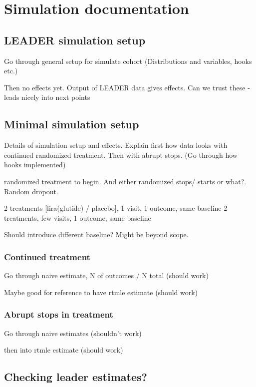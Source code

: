 \documentclass[11pt]{article}
\date{\today}
\title{}
\begin{document}
\tableofcontents

\section{Simulation documentation}
\label{sec:org4b5e02e}

\subsection{LEADER simulation setup}
\label{sec:org85cbb83}

Go through general setup for simulate cohort (Distributions
and variables, hooks etc.)

Then no effects yet. Output of LEADER data gives effects.
Can we trust these - leads nicely into next points
\subsection{Minimal simulation setup}
\label{sec:orgc5f26a2}

Details of simulation setup and effects. Explain first how
data looks with continued randomized treatment. Then with
abrupt stops. (Go through how hooks implemented)

randomized treatment to begin. And either randomized stops/
starts or what?. Random dropout.

2 treatments [lira(glutide) / placebo], 1 visit, 1 outcome, same baseline
2 treatments, few visits, 1 outcome, same baseline

Should introduce different baseline? Might be beyond scope.
\subsubsection{Continued treatment}
\label{sec:org838aba7}

Go through naive estimate, N of outcomes / N total (should work)

Maybe good for reference to have rtmle estimate (should work)
\subsubsection{Abrupt stops in treatment}
\label{sec:orgba15482}

Go through naive estimates (shouldn't work)

then into rtmle estimate (should work)
\subsection{Checking leader estimates?}
\label{sec:org0535517}
\end{document}
